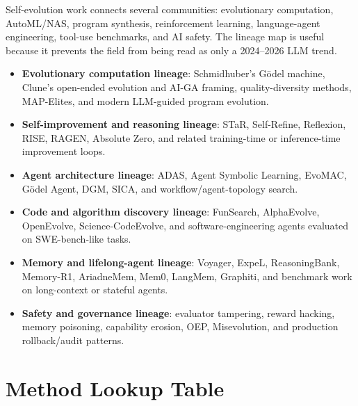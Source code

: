 Self-evolution work connects several communities: evolutionary computation, AutoML/NAS, program synthesis, reinforcement learning, language-agent engineering, tool-use benchmarks, and AI safety. The lineage map is useful because it prevents the field from being read as only a 2024--2026 LLM trend.

\begin{itemize}
\item \textbf{Evolutionary computation lineage}: Schmidhuber's G\"{o}del machine, Clune's open-ended evolution and AI-GA framing, quality-diversity methods, MAP-Elites, and modern LLM-guided program evolution.
\item \textbf{Self-improvement and reasoning lineage}: STaR, Self-Refine, Reflexion, RISE, RAGEN, Absolute Zero, and related training-time or inference-time improvement loops.
\item \textbf{Agent architecture lineage}: ADAS, Agent Symbolic Learning, EvoMAC, G\"{o}del Agent, DGM, SICA, and workflow/agent-topology search.
\item \textbf{Code and algorithm discovery lineage}: FunSearch, AlphaEvolve, OpenEvolve, Science-CodeEvolve, and software-engineering agents evaluated on SWE-bench-like tasks.
\item \textbf{Memory and lifelong-agent lineage}: Voyager, ExpeL, ReasoningBank, Memory-R1, AriadneMem, Mem0, LangMem, Graphiti, and benchmark work on long-context or stateful agents.
\item \textbf{Safety and governance lineage}: evaluator tampering, reward hacking, memory poisoning, capability erosion, OEP, Misevolution, and production rollback/audit patterns.
\end{itemize}

\section{Method Lookup Table}
\label{app:method-lookup}

